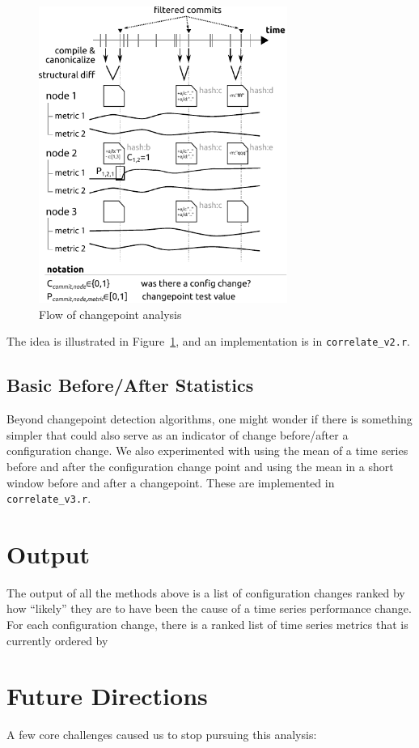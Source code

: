 \documentclass[twocolumn]{article}
\begin{document}
\begin{figure}[!t]
\includegraphics[width=3.2in]{analysis-flow.pdf}
\caption{Flow of changepoint analysis}
\label{fig:analysis-flow}
\end{figure}

The idea is illustrated in Figure~\ref{fig:analysis-flow}, and an implementation is in \texttt{correlate\_v2.r}.

\subsection{Basic Before/After Statistics}
Beyond changepoint detection algorithms, one might wonder if there is something simpler that could also serve as an indicator of change before/after a configuration change. We also experimented with using the mean of a time series before and after the configuration change point and using the mean in a short window before and after a changepoint. These are implemented in \texttt{correlate\_v3.r}.

\section{Output}
The output of all the methods above is a list of configuration changes ranked by how ``likely'' they are to have been the cause of a time series performance change. For each configuration change, there is a ranked list of time series metrics that is currently ordered by 

\section{Future Directions}
A few core challenges caused us to stop pursuing this analysis:
\end{document}
